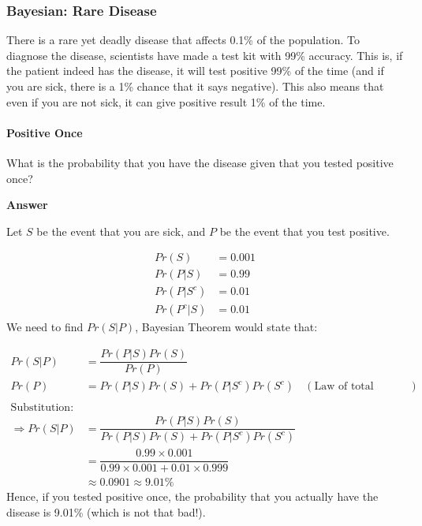 \documentclass[
]{article}
\begin{document}
\hypertarget{bayesian-rare-disease}{%
\subsubsection{Bayesian: Rare Disease}\label{bayesian-rare-disease}}

There is a rare yet deadly disease that affects 0.1\% of the population.
To diagnose the disease, scientists have made a test kit with 99\%
accuracy. This is, if the patient indeed has the disease, it will test
positive 99\% of the time (and if you are sick, there is a 1\% chance
that it says negative). This also means that even if you are not sick,
it can give positive result 1\% of the time.

\hypertarget{positive-once}{%
\paragraph{Positive Once}\label{positive-once}}

What is the probability that you have the disease given that you tested
positive once?

\textbf{Answer}

Let \(S\) be the event that you are sick, and \(P\) be the event that
you test positive.

\[
\begin{aligned}
Pr(S) &= 0.001 \\
Pr(P | S) &= 0.99 \\
Pr(P | S^c) &= 0.01 \\
Pr(P^c |S) &= 0.01
\end{aligned}
\] We need to find \(Pr(S|P)\), Bayesian Theorem would state that:

\[
\begin{aligned}
Pr(S|P) &= \dfrac{Pr(P|S)Pr(S)}{Pr(P)} \\
Pr(P) &= Pr(P|S)Pr(S) + Pr(P|S^c)Pr(S^c) & (\text{Law of total probability}) \\
\\ \text{Substitution:} \\
\Rightarrow Pr(S|P) &= \dfrac{Pr(P|S)Pr(S)}{Pr(P|S)Pr(S) + Pr(P|S^c)Pr(S^c)} \\
&= \dfrac{0.99\times0.001}{0.99\times 0.001 + 0.01\times0.999} \\
&\approx 0.0901\approx9.01\%
\end{aligned}
\] Hence, if you tested positive once, the probability that you actually
have the disease is 9.01\% (which is not that bad!).
\end{document}
